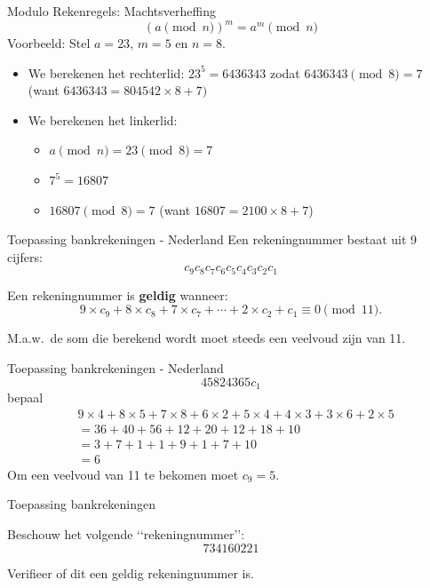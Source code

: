 \documentclass{beamer}
\begin{document}
\begin{frame}{Modulo Rekenregels: Machtsverheffing}
	\[ (a \pmod{n})^m  =  a^m  \pmod{n}\]
	\vspace{0.5cm}
	Voorbeeld: Stel $a = 23$, $m = 5$ en $n = 8$.
		\begin{itemize}
		\pause \item We berekenen het rechterlid: $23^5 = 6436343$ zodat $6436343 \pmod 8 = 7$ 
		(want $6436343 = 804542 \times 8 + 7)$
		\pause \item We berekenen het linkerlid:
		\begin{itemize}
			\pause\item $a \pmod n = 23 \pmod{8} = 7$
			\pause\item $7^5 = 16807$
			\pause \item $16807 \pmod{8} = 7$ (want $16807 =2100 \times 8 + 7$)
		\end{itemize}
	\end{itemize}
	
\end{frame}

\begin{frame}{Toepassing bankrekeningen - Nederland}
Een rekeningnummer bestaat uit 9 cijfers:
	\[ c_9c_8c_7c_6c_5c_4c_3c_2c_1\]
	
Een rekeningnummer is \textbf{geldig} wanneer:
\[
9\times c_9 + 8\times c_8 + 7\times c_7 + \cdots + 2\times c_2 + c_1 \equiv 0 \pmod{11}.
\]	
	
M.a.w.\ de som die berekend wordt moet steeds een veelvoud zijn van 11.
\end{frame}

\begin{frame}{Toepassing bankrekeningen - Nederland}
	\[ 45824365c_1\]
	bepaal
	\begin{align*}
& 	 9 \times 4 + 8 \times 5 + 7\times 8 + 6\times 2 + 5\times 4 + 4\times 3 + 3\times 6 +  2 \times 5 \\
 & = 36 + 40 + 56 + 12 + 20 +12 + 18 + 10 \\
 & = 3 + 7 + 1 + 1 + 9 + 1 + 7 + 10 \\
 & =6
	 \end{align*}
Om een veelvoud van 11 te bekomen moet $c_9 = 5$.	
\end{frame}

\begin{frame}{Toepassing bankrekeningen}

Beschouw het volgende \lq\lq rekeningnummer\rq\rq:
\[
734160221
\]

Verifieer of dit een geldig rekeningnummer is.

\end{frame}
\end{document}
